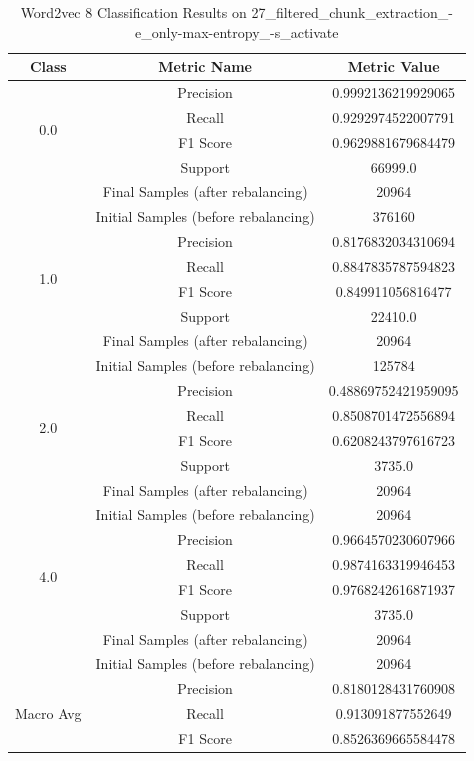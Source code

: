 \begin{longtable}{|c|c|c|}
\caption{Word2vec 8 Classification Results on 27\_filtered\_chunk\_extraction\_-e\_only-max-entropy\_-s\_activate} \label{tab:27_filtered_chunk_extraction_-e_only-max-entropy_-s_activate_word2vec_8_classifiers_results} \\
\hline
Class & Metric Name & Metric Value \\
\hline
\multirow{4}{*}{0.0} & Precision & 0.9992136219929065 \\
 & Recall & 0.9292974522007791 \\
 & F1 Score & 0.9629881679684479 \\
 & Support & 66999.0 \\
 & Final Samples (after rebalancing) & 20964 \\
 & Initial Samples (before rebalancing) & 376160 \\
\hline
\multirow{4}{*}{1.0} & Precision & 0.8176832034310694 \\
 & Recall & 0.8847835787594823 \\
 & F1 Score & 0.849911056816477 \\
 & Support & 22410.0 \\
 & Final Samples (after rebalancing) & 20964 \\
 & Initial Samples (before rebalancing) & 125784 \\
\hline
\multirow{4}{*}{2.0} & Precision & 0.48869752421959095 \\
 & Recall & 0.8508701472556894 \\
 & F1 Score & 0.6208243797616723 \\
 & Support & 3735.0 \\
 & Final Samples (after rebalancing) & 20964 \\
 & Initial Samples (before rebalancing) & 20964 \\
\hline
\multirow{4}{*}{4.0} & Precision & 0.9664570230607966 \\
 & Recall & 0.9874163319946453 \\
 & F1 Score & 0.9768242616871937 \\
 & Support & 3735.0 \\
 & Final Samples (after rebalancing) & 20964 \\
 & Initial Samples (before rebalancing) & 20964 \\
\hline
\multirow{4}{*}{Macro Avg} & Precision & 0.8180128431760908 \\
 & Recall & 0.913091877552649 \\
 & F1 Score & 0.8526369665584478 \\

\end{longtable}
